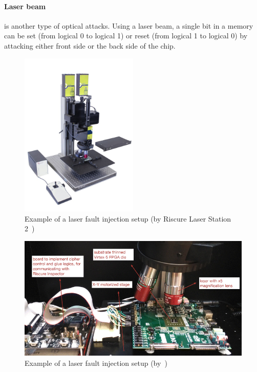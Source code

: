 \paragraph{Laser beam} is another type of optical attacks. Using a laser beam, a single bit in a memory can be set (from logical 0 to logical 1) or reset (from logical 1 to logical 0) by attacking either front side or the back side of the chip.

\begin{figure}[ht]
    \centering
    \includegraphics[width=0.5\textwidth]{c2_soa/img/LS2.jpeg}
    \caption{Example of a laser fault injection setup (by Riscure Laser Station 2~\cite{riscure_station})}
    \label{fig:ls2}
\end{figure}

\begin{figure}[ht]
    \centering
    \includegraphics[width=\textwidth]{c2_soa/img/lfi_setup.png}
    \caption{Example of a laser fault injection setup (by~\cite{JHJBC-17-hss})}
    \label{fig:lfi_setup}
\end{figure}

